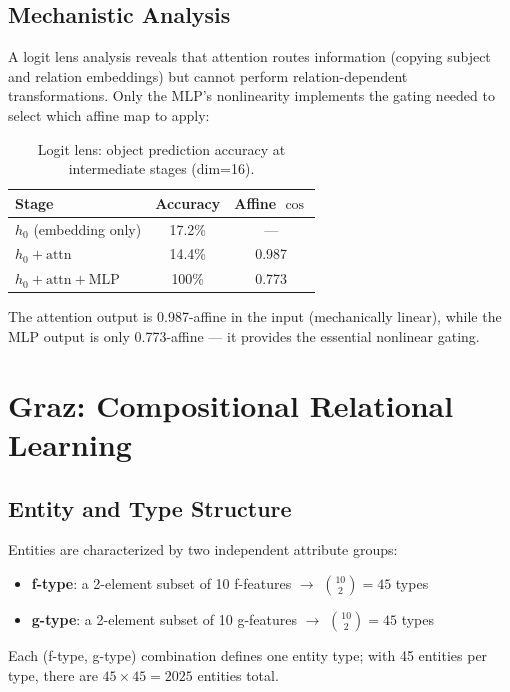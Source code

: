\documentclass[11pt]{article}
\begin{document}
\subsection{Mechanistic Analysis}

A logit lens analysis reveals that attention routes information (copying subject and
relation embeddings) but cannot perform relation-dependent transformations. Only the
MLP's nonlinearity implements the gating needed to select which affine map to apply:

\begin{table}[h]
\centering
\caption{Logit lens: object prediction accuracy at intermediate stages (dim=16).}
\begin{tabular}{lcc}
\toprule
Stage & Accuracy & Affine $\cos$ \\
\midrule
$h_0$ (embedding only) & 17.2\% & --- \\
$h_0 + \text{attn}$ & 14.4\% & 0.987 \\
$h_0 + \text{attn} + \text{MLP}$ & 100\% & 0.773 \\
\bottomrule
\end{tabular}
\end{table}

The attention output is 0.987-affine in the input (mechanically linear), while the MLP
output is only 0.773-affine --- it provides the essential nonlinear gating.

\section{Graz: Compositional Relational Learning}
\label{sec:graz}

\subsection{Entity and Type Structure}

Entities are characterized by two independent attribute groups:
\begin{itemize}
\item \textbf{f-type}: a 2-element subset of 10 f-features $\to$ $\binom{10}{2} = 45$ types
\item \textbf{g-type}: a 2-element subset of 10 g-features $\to$ $\binom{10}{2} = 45$ types
\end{itemize}
Each (f-type, g-type) combination defines one entity type; with 45 entities per type,
there are $45 \times 45 = 2025$ entities total.
\end{document}
